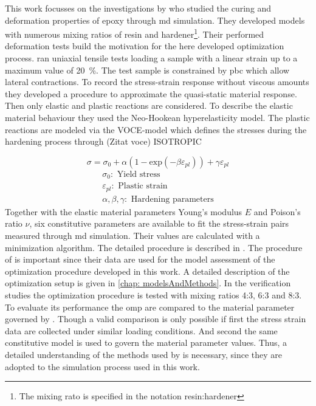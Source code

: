 This work focusses on the investigations by \citet{ries_deciphering_nodate} who studied the curing and deformation properties of epoxy through \acrshort{md} simulation. They developed models with numerous mixing ratios of resin and hardener\footnote{The mixing rato is specified in the notation resin:hardener}. Their performed deformation tests build the motivation for the here developed optimization process. \citet{ries_deciphering_nodate} ran uniaxial tensile tests loading a sample with a linear strain up to a maximum value of 20 \%. The test sample is constrained by \acrshort{pbc} which allow lateral contractions. To record the stress-strain response without viscous amounts they developed a procedure to approximate the quasi-static material response. Then only elastic and plastic reactions are considered. To describe the elastic material behaviour they used the Neo-Hookean hyperelasticity model. The plastic reactions are modeled via the VOCE-model which defines the stresses during the hardening process through (Zitat voce) ISOTROPIC

\begin{equation}
    \sigma = \sigma_0 + \alpha(1 - \text{exp}(-\beta \varepsilon_{pl})) + \gamma \varepsilon_{pl}
\end{equation}
\begin{gather*}
    \sigma_0: \text{ Yield stress} \\
    \varepsilon_{pl}: \text{ Plastic strain} \\
    \alpha, \beta,  \gamma: \text{ Hardening parameters}
\end{gather*}
Together with the elastic material parameters Young's modulus $E$ and Poison's ratio $\nu$, six constitutive parameters are available to fit the stress-strain pairs measured through \acrshort{md} simulation. Their values are calculated with a minimization algorithm. The detailed procedure is described in \cite{ries_deciphering_nodate}. The procedure of \citet{ries_deciphering_nodate} is important since their data are used for the model assessment of the optimization procedure developed in this work. A detailed description of the optimization setup is given in \autoref{chap: modelsAndMethods}. In the verification studies the optimization procedure is tested with mixing ratios 4:3, 6:3 and 8:3. To evaluate its performance the \acrfull{omp} are compared to the material parameter governed by \citet{ries_deciphering_nodate}. Though a valid comparison is only possible if first the stress strain data are collected under similar loading conditions. And second the same constitutive model is used to govern the material parameter values. Thus, a detailed understanding of the methods used by \citet{ries_deciphering_nodate} is necessary, since they are adopted to the simulation process used in this work.  




